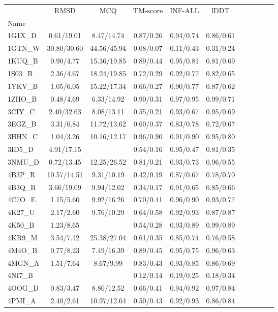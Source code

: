 \begin{tabular}{lcccccccccc}
\toprule
 & RMSD & MCQ & TM-score & INF-ALL & lDDT \\
Name &  &  &  &  &  \\
\midrule
1G1X\_D & 0.61/19.01 & 8.47/14.74 & 0.87/0.26 & 0.94/0.74 & 0.86/0.61 \\
1GTN\_W & 30.80/30.60 & 44.56/45.94 & 0.08/0.07 & 0.11/0.43 & 0.31/0.24 \\
1KUQ\_B & 0.90/4.77 & 15.36/19.85 & 0.89/0.44 & 0.95/0.81 & 0.81/0.69 \\
1S03\_B & 2.36/4.67 & 18.24/19.85 & 0.72/0.29 & 0.92/0.77 & 0.82/0.65 \\
1YKV\_B & 1.05/6.05 & 15.22/17.34 & 0.66/0.27 & 0.90/0.77 & 0.87/0.62 \\
1ZHO\_B & 0.48/4.69 & 6.33/14.92 & 0.90/0.31 & 0.97/0.95 & 0.99/0.71 \\
3CIY\_C & 2.40/32.63 & 8.08/13.11 & 0.55/0.21 & 0.93/0.67 & 0.95/0.69 \\
3EGZ\_B & 3.31/6.84 & 11.72/13.62 & 0.60/0.37 & 0.83/0.78 & 0.72/0.67 \\
3HHN\_C & 1.04/3.26 & 10.16/12.17 & 0.96/0.90 & 0.91/0.90 & 0.95/0.80 \\
3ID5\_D & 4.91/17.15 &  & 0.54/0.16 & 0.95/0.47 & 0.81/0.35 \\
3NMU\_D & 0.72/13.45 & 12.25/26.52 & 0.81/0.21 & 0.93/0.73 & 0.96/0.55 \\
4B3P\_R & 10.57/14.51 & 9.31/10.19 & 0.42/0.19 & 0.87/0.67 & 0.78/0.70 \\
4B3Q\_R & 3.66/19.09 & 9.94/12.02 & 0.34/0.17 & 0.91/0.65 & 0.85/0.66 \\
4C7O\_E & 1.15/5.60 & 9.92/16.26 & 0.70/0.41 & 0.96/0.90 & 0.93/0.77 \\
4K27\_U & 2.17/2.60 & 9.76/10.29 & 0.64/0.58 & 0.92/0.93 & 0.87/0.87 \\
4K50\_B & 1.23/8.65 &  & 0.54/0.28 & 0.93/0.89 & 0.99/0.89 \\
4KR9\_M & 3.54/7.12 & 25.38/27.04 & 0.61/0.35 & 0.85/0.74 & 0.76/0.58 \\
4M4O\_B & 0.77/8.23 & 7.49/16.39 & 0.89/0.45 & 0.95/0.75 & 0.96/0.63 \\
4MGN\_A & 1.51/7.64 & 8.67/9.99 & 0.83/0.43 & 0.93/0.85 & 0.86/0.69 \\
4NI7\_B &  &  & 0.12/0.14 & 0.19/0.25 & 0.18/0.34 \\
4OOG\_D & 0.83/3.47 & 8.80/12.52 & 0.66/0.41 & 0.94/0.92 & 0.97/0.84 \\
4PMI\_A & 2.40/2.61 & 10.97/12.64 & 0.50/0.43 & 0.92/0.93 & 0.86/0.84 \\

\end{tabular}
